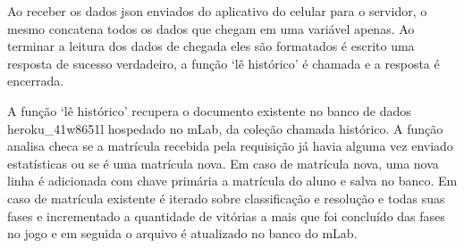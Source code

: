 Ao receber os dados json enviados do aplicativo do celular para o servidor, o mesmo concatena todos os dados que chegam em uma variável apenas. Ao terminar a leitura dos dados de chegada eles são formatados é escrito uma resposta de sucesso verdadeiro, a função ‘lê histórico’ é chamada e a resposta é encerrada.

A função ‘lê histórico’ recupera o documento existente no banco de dados heroku\_41w8651l hospedado no mLab, da coleção chamada histórico. A função analisa checa se a matrícula recebida pela requisição já havia alguma vez enviado estatísticas ou se é uma matrícula nova. Em caso de matrícula nova, uma nova linha é adicionada com chave primária a matrícula do aluno e salva no banco. Em caso de matrícula existente é iterado sobre classificação e resolução e todas suas fases e incrementado a quantidade de vitórias a mais que foi concluído das fases no jogo e em seguida o arquivo é atualizado no banco do mLab.


 


